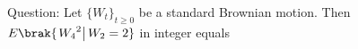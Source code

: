 \documentclass[journal,12pt,twocolumn]{IEEEtran}
\theoremstyle{remark}
\begin{document}



\maketitle

\newpage


\bigskip

\renewcommand{\thefigure}{\theenumi}
\renewcommand{\thetable}{\theenumi}

Question: Let $\{W_t\}_{t \geq 0}$ be a standard Brownian motion. Then $E\brak{\left.{W_4}^2\right | W_2=2}$ in integer equals
\end{document}
